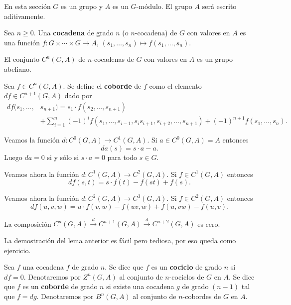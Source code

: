 En esta sección $G$ es un grupo y $A$ es un $G$-módulo. El grupo $A$ será
escrito aditivamente. 

\begin{definition}
	Sea $n\geq0$. Una \textbf{cocadena}
	de grado $n$ (o $n$-cocadena) de $G$ con valores en $A$ es una función
	$f\colon G\times\cdots\times G\to A$, $(s_1,\dots,s_n)\mapsto
	f(s_1,\dots,s_n)$. 
\end{definition}

	El conjunto $C^n(G,A)$ de $n$-cocadenas de $G$ con valores en
	$A$ es un grupo abeliano. 

\begin{definition}
	Sea $f\in C^n(G,A)$. Se define el \textbf{coborde} de $f$ como el elemento $df\in
	C^{n+1}(G,A)$ dado por 
	\begin{align*}
		df(s_1,\dots,&s_{n+1})=s_1\cdot f(s_2,\dots,s_{n+1})\\
		&+\sum_{i=1}^n (-1)^i f(s_1,\dots,s_{i-1},s_is_{i+1},s_{i+2},\dots,s_{n+1})
		+(-1)^{n+1}f(s_1,\dots,s_n).
	\end{align*}
\end{definition}

\begin{example}
	Veamos la función $d\colon C^0(G,A)\to C^1(G,A)$.  Si $a\in C^0(G,A)=A$
	entonces 
	\[
	da(s)=s\cdot a-a.
	\]
	Luego $da=0$ si y sólo si $s\cdot a=0$ para
	todo $s\in G$.
\end{example}

\begin{example}
	Veamos ahora la función $d\colon C^1(G,A)\to C^2(G,A)$. Si $f\in C^1(G,A)$
	entonces
	\[
	df(s,t)=s\cdot f(t)-f(st)+f(s).
	\]
\end{example}

\begin{example}
	Veamos ahora la función $d\colon C^2(G,A)\to C^3(G,A)$. Si $f\in C^2(G,A)$
	entonces
	\[
	df(u,v,w)=u\cdot f(v,w)-f(uv,w)+f(u,vw)-f(u,v).
	\]
\end{example}

\begin{lemma}
	\label{lemma:dd=0}
	La composición $C^n(G,A)\xrightarrow{d} C^{n+1}(G,A)\xrightarrow{d}
	C^{n+2}(G,A)$ es cero.
\end{lemma}

La demostración del lema anterior es fácil pero tediosa, por eso queda como ejercicio. 

\begin{definition}
	Sea $f$ una cocadena $f$ de grado $n$. Se dice que $f$ es un
	\textbf{cociclo} de grado $n$ si $df=0$. Denotaremos por $Z^n(G,A)$ al
	conjunto de $n$-cociclos de $G$ en $A$. Se dice que $f$ es un
	\textbf{coborde} de grado $n$ si existe una cocadena $g$ de grado $(n-1)$
	tal que $f=dg$. Denotaremos por $B^n(G,A)$ al conjunto de $n$-cobordes de
	$G$ en $A$.
\end{definition}

